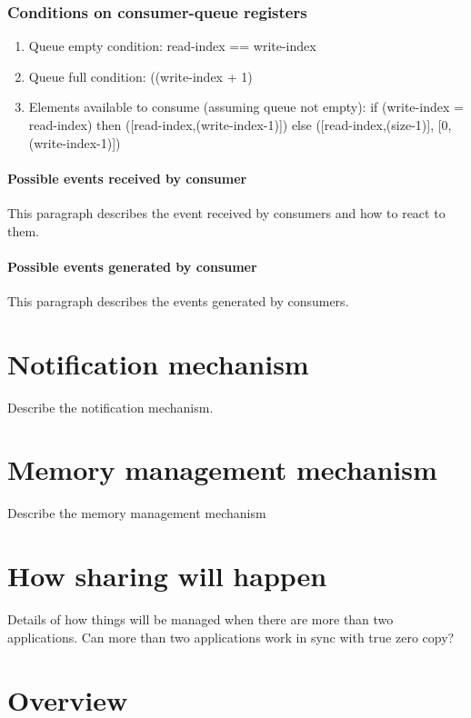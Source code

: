 \documentclass[a4paper,twoside]{report} %
\begin{document}
\subsubsection{Conditions on consumer-queue registers}

\begin{enumerate} 
  \item Queue empty condition: read-index == write-index
  \item Queue full condition: ((write-index + 1)%
  \item Elements available to consume (assuming queue not empty): 
  if (write-index = read-index)
    then ([read-index,(write-index-1)])
    else ([read-index,(size-1)], [0, (write-index-1)])
\end{enumerate} 

\paragraph{Possible events received by consumer}
This paragraph describes the event received by consumers and how
to react to them.

\paragraph{Possible events generated by consumer}
This paragraph describes the events generated by consumers.

\section{Notification mechanism}
Describe the notification mechanism.

\section{Memory management mechanism}
Describe the memory management mechanism

\section{How sharing will happen}
Details of how things will be managed when there are more than two
applications. Can more than two applications work in sync with true 
zero copy?
 
\section{Overview}
\end{document}
